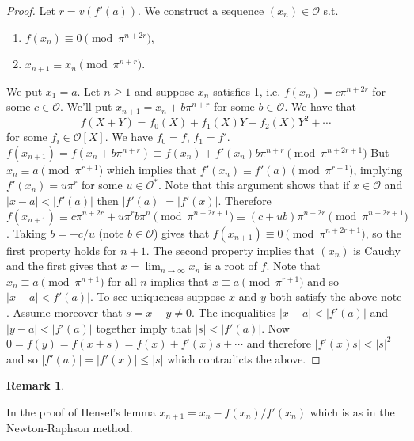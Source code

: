 \documentclass[10pt,]{book}
\newcommand{\lt}{<}
\theoremstyle{plain}
\theoremstyle{definition}
\newtheorem{remark}[theorem]{Remark}
\newcommand{\cO}{\mathcal{O}}
\begin{document}
\begin{proof}

            Let \(r = v(f'(a))\).
            We construct a sequence \((x_n)\in \cO\) s.t.
            \begin{enumerate}
\item{}\(f(x_n) \equiv 0 \pmod{\pi^{n + 2r}}\),\item{}\(x_{n+1} \equiv x_n \pmod{\pi^{n + r}}\).\end{enumerate}

            We put \(x_1 = a\).
            Let \(n\ge 1\) and suppose \(x_n\) satisfies 1, i.e. \(f(x_n) = c\pi^{n + 2r}\) for some \(c\in \cO\).
            We'll put \(x_{n+1} = x_n + b\pi^{n+r}\) for some \(b \in \cO\).
            We have that
            \[f(X+Y) = f_0(X) + f_1(X) Y + f_2(X) Y^2 + \cdots\]
            for some \(f_i\in \cO[X]\).
            We have \(f_0 = f\), \(f_1  =f'\).
            \(f(x_{n+1}) = f(x_n + b\pi^{n +r}) \equiv f(x_n) + f'(x_n)b\pi^{n+r} \pmod{\pi^{n + 2r + 1}}\)
            But \(x_n \equiv a \pmod{\pi^{r+1}}\) which implies that \(f'(x_n) \equiv f'(a) \pmod{\pi^{r+1}}\), implying \(f'(x_n) = u \pi^r\) for some \(u \in \cO^*\).
            Note that this argument shows that if \(x \in \cO\) and \(|x-a| \lt |f'(a)|\) then \(|f'(a)| = |f'(x)|\).
            Therefore \(f(x_{n+1}) \equiv c\pi^{n+2r} + u \pi^r b\pi^n \pmod{\pi^{n+2r + 1}} \equiv (c + ub) \pi ^{n + 2r}\pmod{\pi^{n+2r+1}}\).
            Taking \(b = -c/u\) (note \(b \in \cO\)) gives that \(f(x_{n+1}) \equiv 0 \pmod{\pi^{n + 2r + 1}}\), so the first property holds for \(n+1\).
            The second property implies that \((x_n)\) is Cauchy and the first gives that \(x = \lim_{n\to \infty}x_n\) is a root of \(f\).
            Note that \(x_n \equiv a \pmod{\pi^{n + 1}}\) for all \(n\) implies that \(x \equiv a \pmod{\pi^{r+1}}\) and so \(|x-a| \lt f'(a)|\).
            \newline{}
            To see uniqueness suppose \(x\) and \(y\) both satisfy the above note .
            Assume moreover that \(s = x-y \ne 0\).
            The inequalities \(|x-a| \lt |f'(a)|\) and \(|y-a| \lt |f'(a)|\) together imply that \(|s| \lt |f'(a)|\).
            Now \(0 = f(y) = f(x + s) = f(x) + f'(x) s + \cdots\) and therefore \(|f'(x)s |\lt |s|^2\) and so \(|f'(a)| = |f'(x)| \le |s|\) which contradicts the above.
          \end{proof}
\begin{remark}\label{remark-5}

            In the proof of Hensel's lemma \(x_{n+1} = x_n - f(x_n)/f'(x_n)\) which is as in the Newton-Raphson method.
          \end{remark}
\end{document}
